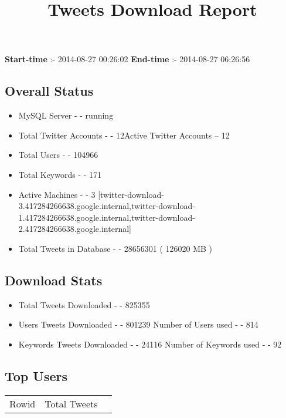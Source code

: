 \documentclass{article}\usepackage[T1]{fontenc}
\begin{document}
\title{\textbf{Tweets Download Report}}
               \date{}
                \maketitle
               \centerline{\textbf{Start-time} :- 2014-08-27 00:26:02 \hspace{40pt} \textbf{End-time} :- 2014-08-27 06:26:56}               \subsection*{Overall Status}                \begin{itemize}                \item MySQL Server - - running               \item Total Twitter Accounts - - 12\newline Active Twitter Accounts -- 12               \item Total Users - - 104966               \item Total Keywords - - 171               \item Active Machines - - 3 [twitter-download-3.417284266638.google.internal,twitter-download-1.417284266638.google.internal,twitter-download-2.417284266638.google.internal]               \item Total Tweets in Database - - 28656301 ( 126020 MB )               \end{itemize}               \subsection*{Download Stats}                \begin{itemize}                \item Total Tweets Downloaded - - 825355               \item Users Tweets Downloaded - - 801239 \newline Number of Users used - - 814               \item Keywords Tweets Downloaded - - 24116 \newline Number of Keywords used - - 92              \end{itemize}              \subsection*{Top Users}\begin{tabular}{|c|c|c|}         \hline         Rowid & Total Tweets \\ 

\end{tabular}
\end{document}

